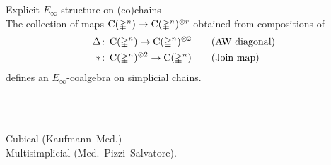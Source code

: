 \begin{frame}{Explicit $E_\infty$-structure on (co)chains}
	\pause
	 \\
	The collection of maps $\operatorname{C}(\mathbb{\Delta}^n) \to \operatorname{C}(\mathbb{\Delta}^n)^{\otimes r}$ obtained from compositions of
	\begin{align*}
		\Delta &\colon \operatorname{C}(\mathbb{\Delta}^n) \to \operatorname{C}(\mathbb{\Delta}^n)^{\otimes 2}
		\qquad \text{(AW diagonal)} \\
		\ast &\colon \operatorname{C}(\mathbb{\Delta}^n)^{\otimes 2} \to \operatorname{C}(\mathbb{\Delta}^n)
		\qquad \text{(Join map)}
	\end{align*}
	defines an $E_\infty$-coalgebra on simplicial chains.

	\bigskip\pause
	 \\
	\qquad\qquad \scalebox{0.7}{}

	\bigskip\pause
	 \\
	Cubical (Kaufmann--Med.) \\
	Multisimplicial (Med.--Pizzi--Salvatore).
\end{frame}

